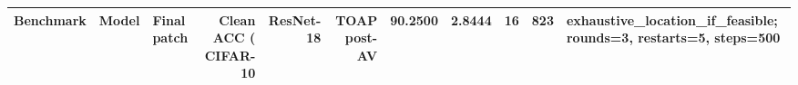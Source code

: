 \begin{tabular}{lllrrrrl}
\toprule
Benchmark & Model & Final patch & Clean ACC (%
\midrule
CIFAR-10 & ResNet-18 & TOAP post-AV & 90.2500 & 2.8444 & 16 & 823 & exhaustive_location_if_feasible; rounds=3, restarts=5, steps=500 \\
\bottomrule
\end{tabular}
